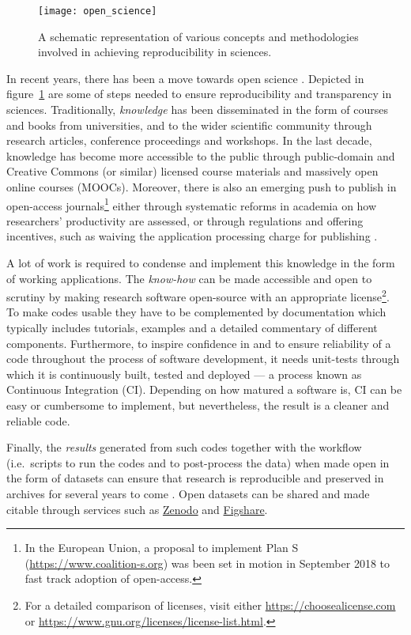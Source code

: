 \begin{figure}[h]
  \centering
  \texttt{[image: open\_science]}
  \caption{A schematic representation of various concepts and methodologies
  involved in achieving reproducibility in sciences.}\label{fig:opensci}
\end{figure}

In recent years, there has been a move towards open science
\citep[see the report by][]{royal_society_great_britain_science_2012}.
%
Depicted in figure~\ref{fig:opensci} are some of steps needed to ensure
reproducibility and transparency in sciences.
%
Traditionally, \emph{knowledge} has been disseminated in the form of courses
and books from universities, and to the wider scientific community through
research articles, conference proceedings and workshops.
%
In the last decade, knowledge has become more accessible to the public
through public-domain and Creative Commons (or similar) licensed course
materials and massively open online courses (MOOCs). Moreover, there is also an
emerging push to publish in open-access journals\footnote{In the European
  Union, a proposal to implement Plan S (\url{https://www.coalition-s.org}) was
  been set in motion in September 2018 to fast track adoption of open-access.
} either through systematic
reforms in academia on how researchers' productivity are assessed, or through
regulations and offering incentives, such as waiving the application processing
charge for publishing \citep{nosek_promoting_2015}.

A lot of work is required to condense and implement this knowledge in the form
of working applications.
%
The \emph{know-how} can be made accessible and open to scrutiny by making
research software open-source with an appropriate license\footnote{For a
	detailed comparison of licenses, visit either
	\url{https://choosealicense.com} or
	\url{https://www.gnu.org/licenses/license-list.html}. }.
%
To make codes usable they have to be complemented by documentation which
typically includes tutorials, examples and a detailed commentary of different
components.
%
Furthermore, to inspire confidence in and to ensure reliability of a code
throughout the process of software development, it needs unit-tests through
which it is continuously built, tested and deployed --- a process known as
Continuous Integration (CI). Depending on how matured a software is, CI can be
easy or cumbersome to implement, but nevertheless, the result is a cleaner and
reliable code.

Finally, the \emph{results} generated from such codes together with the
workflow (i.e.\ scripts to run the codes and to post-process the data) when made
open in the form of datasets can ensure that research is reproducible and
preserved in archives for several years to come \citep{gewin_data_2016}. Open
datasets can be shared and made citable through services such as
\href{https://zenodo.org}{Zenodo} and \href{https://figshare.com}{Figshare}.

